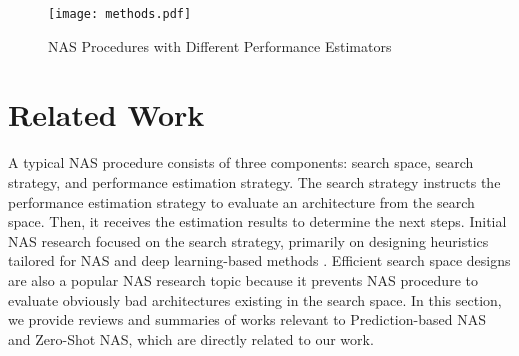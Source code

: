 \documentclass[lettersize,journal]{IEEEtran}
\begin{document}
    \begin{figure}
        \centering
        \texttt{[image: methods.pdf]}
        \caption{NAS Procedures with Different Performance Estimators}
        \label{fig:method}
    \end{figure}

\section{Related Work} \label{sec:related_work}



A typical NAS procedure consists of three components: search space, search strategy, and performance estimation strategy. The search strategy instructs the performance estimation strategy to evaluate an architecture from the search space. Then, it receives the estimation results to determine the next steps. Initial NAS research focused on the search strategy, primarily on designing heuristics tailored for NAS \cite{Genetic, RegularizedEvo} and deep learning-based methods \cite{rl1}. Efficient search space designs are also a popular NAS research topic \cite{nds, Mobilenetv3} because it prevents NAS procedure to evaluate obviously bad architectures existing in the search space. In this section, we provide reviews and summaries of works relevant to Prediction-based NAS and Zero-Shot NAS, which are directly related to our work.
\end{document}
